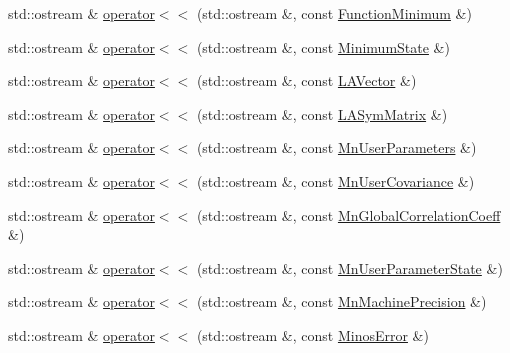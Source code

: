 \begin{DoxyCompactItemize}
std\+::ostream \& \mbox{\hyperlink{namespaceROOT_1_1Minuit2_a38083dea2c583232d8c33ed056b555ef}{operator$<$$<$}} (std\+::ostream \&, const \mbox{\hyperlink{classROOT_1_1Minuit2_1_1FunctionMinimum}{Function\+Minimum}} \&)
\item 
std\+::ostream \& \mbox{\hyperlink{namespaceROOT_1_1Minuit2_a172c627b1d5fd6191ca54f94090cd304}{operator$<$$<$}} (std\+::ostream \&, const \mbox{\hyperlink{classROOT_1_1Minuit2_1_1MinimumState}{Minimum\+State}} \&)
\item 
std\+::ostream \& \mbox{\hyperlink{namespaceROOT_1_1Minuit2_a687e586a693320c3d638977d002a9e50}{operator$<$$<$}} (std\+::ostream \&, const \mbox{\hyperlink{classROOT_1_1Minuit2_1_1LAVector}{L\+A\+Vector}} \&)
\item 
std\+::ostream \& \mbox{\hyperlink{namespaceROOT_1_1Minuit2_a37c2d73b40109f988c5ea59e1edf1f8d}{operator$<$$<$}} (std\+::ostream \&, const \mbox{\hyperlink{classROOT_1_1Minuit2_1_1LASymMatrix}{L\+A\+Sym\+Matrix}} \&)
\item 
std\+::ostream \& \mbox{\hyperlink{namespaceROOT_1_1Minuit2_a950e1e56f48df042ba519464bda3f1ea}{operator$<$$<$}} (std\+::ostream \&, const \mbox{\hyperlink{classROOT_1_1Minuit2_1_1MnUserParameters}{Mn\+User\+Parameters}} \&)
\item 
std\+::ostream \& \mbox{\hyperlink{namespaceROOT_1_1Minuit2_ab0d367617b39c46b8b0eeef75ecc5b75}{operator$<$$<$}} (std\+::ostream \&, const \mbox{\hyperlink{classROOT_1_1Minuit2_1_1MnUserCovariance}{Mn\+User\+Covariance}} \&)
\item 
std\+::ostream \& \mbox{\hyperlink{namespaceROOT_1_1Minuit2_ad8fa7aff1b1b2645f8b2a9c9a2231252}{operator$<$$<$}} (std\+::ostream \&, const \mbox{\hyperlink{classROOT_1_1Minuit2_1_1MnGlobalCorrelationCoeff}{Mn\+Global\+Correlation\+Coeff}} \&)
\item 
std\+::ostream \& \mbox{\hyperlink{namespaceROOT_1_1Minuit2_a30dd5b9978bba19603bb3fb0f7427ddc}{operator$<$$<$}} (std\+::ostream \&, const \mbox{\hyperlink{classROOT_1_1Minuit2_1_1MnUserParameterState}{Mn\+User\+Parameter\+State}} \&)
\item 
std\+::ostream \& \mbox{\hyperlink{namespaceROOT_1_1Minuit2_a490766f2dd62363c6729e716a8da5da8}{operator$<$$<$}} (std\+::ostream \&, const \mbox{\hyperlink{classROOT_1_1Minuit2_1_1MnMachinePrecision}{Mn\+Machine\+Precision}} \&)
\item 
std\+::ostream \& \mbox{\hyperlink{namespaceROOT_1_1Minuit2_a21121467830697f28cd9d979108c44dd}{operator$<$$<$}} (std\+::ostream \&, const \mbox{\hyperlink{classROOT_1_1Minuit2_1_1MinosError}{Minos\+Error}} \&)

\end{DoxyCompactItemize}
